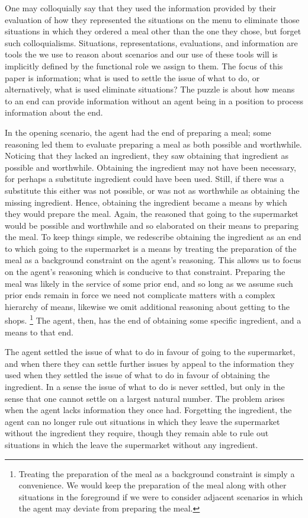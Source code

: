 \documentclass[10pt]{article}
\begin{document}
One may colloquially say that they used the information provided by their evaluation of how they represented the situations on the menu to eliminate those situations in which they ordered a meal other than the one they chose, but forget such colloquialisms.
Situations, representations, evaluations, and information are tools the we use to reason about scenarios and our use of these tools will is implicitly defined by the functional role we assign to them.
The focus of this paper is information; what is used to settle the issue of what to do, or alternatively, what is used eliminate situations?
The puzzle is about how means to an end can provide information without an agent being in a position to process information about the end.

In the opening scenario, the agent had the end of preparing a meal; some reasoning led them to evaluate preparing a meal as both possible and worthwhile.
Noticing that they lacked an ingredient, they saw obtaining that ingredient as possible and worthwhile.
Obtaining the ingredient may not have been necessary, for perhaps a substitute ingredient could have been used.
Still, if there was a substitute this either was not possible, or was not as worthwhile as obtaining the missing ingredient.
Hence, obtaining the ingredient became a means by which they would prepare the meal.
Again, the reasoned that going to the supermarket would be possible and worthwhile and so elaborated on their means to preparing the meal.
To keep things simple, we redescribe obtaining the ingredient as an end to which going to the supermarket is a means by treating the preparation of the meal as a background constraint on the agent's reasoning.
This allows us to focus on the agent's reasoning which is conducive to that constraint.
Preparing the meal was likely in the service of some prior end, and so long as we assume such prior ends remain in force we need not complicate matters with a complex hierarchy of means, likewise we omit additional reasoning about getting to the shops.\nolinebreak
\footnote{Treating the preparation of the meal as a background constraint is simply a convenience.
We would keep the preparation of the meal along with other situations in the foreground if we were to consider adjacent scenarios in which the agent may deviate from preparing the meal.}
The agent, then, has the end of obtaining some specific ingredient, and a means to that end.

The agent settled the issue of what to do in favour of going to the supermarket, and when there they can settle further issues by appeal to the information they used when they settled the issue of what to do in favour of obtaining the ingredient.
In a sense the issue of what to do is never settled, but only in the sense that one cannot settle on a largest natural number.
The problem arises when the agent lacks information they once had.
Forgetting the ingredient, the agent can no longer rule out situations in which they leave the supermarket without the ingredient they require, though they remain able to rule out situations in which the leave the supermarket without any ingredient.
\end{document}
